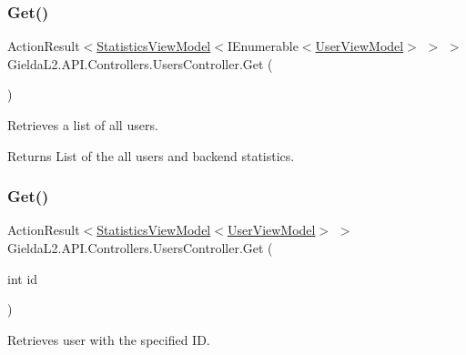 \subsubsection{\texorpdfstring{Get()}{Get()}\hspace{0.1cm}{\footnotesize\ttfamily [1/2]}}
{\footnotesize\ttfamily Action\+Result$<$\mbox{\hyperlink{class_gielda_l2_1_1_a_p_i_1_1_view_models_1_1_view_1_1_statistics_view_model}{Statistics\+View\+Model}}$<$I\+Enumerable$<$\mbox{\hyperlink{class_gielda_l2_1_1_a_p_i_1_1_view_models_1_1_view_1_1_user_view_model}{User\+View\+Model}}$>$ $>$ $>$ Gielda\+L2.\+A\+P\+I.\+Controllers.\+Users\+Controller.\+Get (\begin{DoxyParamCaption}{ }\end{DoxyParamCaption})}



Retrieves a list of all users. 

\begin{DoxyReturn}{Returns}
List of the all users and backend statistics.
\end{DoxyReturn}
\mbox{\label{class_gielda_l2_1_1_a_p_i_1_1_controllers_1_1_users_controller_a0957a53f250fa14681018808613610fe}} 
\subsubsection{\texorpdfstring{Get()}{Get()}\hspace{0.1cm}{\footnotesize\ttfamily [2/2]}}
{\footnotesize\ttfamily Action\+Result$<$\mbox{\hyperlink{class_gielda_l2_1_1_a_p_i_1_1_view_models_1_1_view_1_1_statistics_view_model}{Statistics\+View\+Model}}$<$\mbox{\hyperlink{class_gielda_l2_1_1_a_p_i_1_1_view_models_1_1_view_1_1_user_view_model}{User\+View\+Model}}$>$ $>$ Gielda\+L2.\+A\+P\+I.\+Controllers.\+Users\+Controller.\+Get (\begin{DoxyParamCaption}\item[{int}]{id }\end{DoxyParamCaption})}



Retrieves user with the specified ID. 


